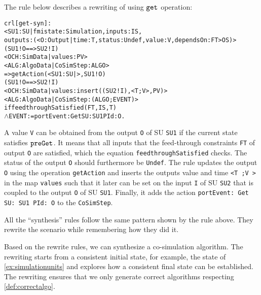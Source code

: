 The rule below describes a rewriting of using $\mathtt{get}_{}$ operation:
\small
\begin{alltt}
crl [get-syn] :
< SU1 : SU | fmistate : Simulation, inputs : IS, 
  outputs : (< O : Output | time : T, status : Undef, value : V, dependsOn : FT > OS) > 
(SU1 ! O ==> SU2 ! I)
< OCH : SimData | values : PV > 
< ALG : AlgoData | CoSimStep : ALGO >
=> getAction(< SU1 : SU | >, SU1 ! O)
  (SU1 ! O ==> SU2 ! I)
  < OCH : SimData | values : insert((SU2 ! I), < T ; V >, PV) >  
  < ALG : AlgoData | CoSimStep : (ALGO ; EVENT) >
if feedthroughSatisfied(FT, IS, T)
\(\land\) EVENT := portEvent: Get SU: SU1 PId: O . 
\end{alltt}
\normalsize
A value \texttt{V} can be obtained from the output \texttt{O} of SU \texttt{SU1} if the current state satisfies $\mathtt{preGet}_{}$.
It means that all inputs that the feed-through constraints \texttt{FT} of output \texttt{O} are satisfied, which the equation \texttt{feedthroughSatisfied} checks.
The status of the output \texttt{O} should furthermore be \texttt{Undef}.
The rule updates the output \texttt{O} using the operation \texttt{getAction} and inserts the outputs value and time \texttt{<T ;V >} in the map \texttt{values} such that it later can be set on the input \texttt{I} of SU \texttt{SU2} that is coupled to the output \texttt{O} of SU \texttt{SU1}.
Finally, it adds the action \texttt{portEvent: Get SU: SU1 PId: O} to the \texttt{CoSimStep}.

All the ``synthesis'' rules follow the same pattern shown by the rule above.
They rewrite the scenario while remembering how they did it.

Based on the rewrite rules, we can synthesize a co-simulation algorithm.
The rewriting starts from a consistent initial state, for example, the state of \cref{ex:simulationunits} and explores how a consistent final state can be established.
The rewriting ensures that we only generate correct algorithms respecting \cref{def:correctalgo}.  

